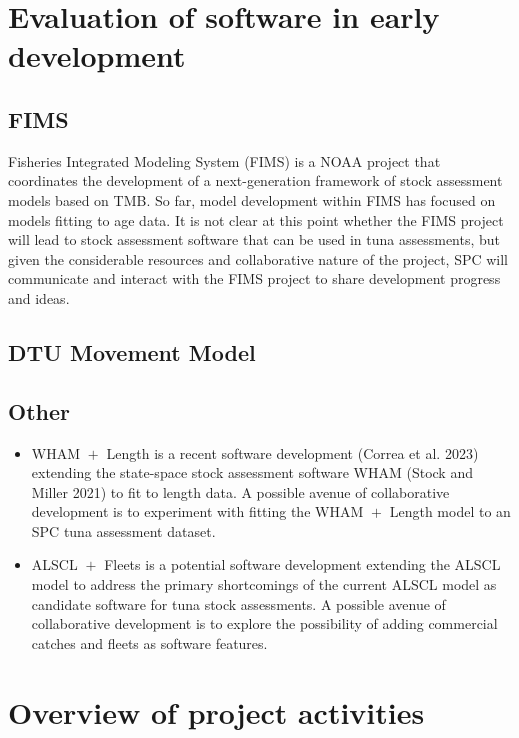 \documentclass{SCreport}
\begin{document}
\section{Evaluation of software in early development}
\label{sec:software-early-development}

\subsection{FIMS}

Fisheries Integrated Modeling System (FIMS) is a NOAA project that coordinates
the development of a next-generation framework of stock assessment models based
on TMB. So far, model development within FIMS has focused on models fitting to
age data. It is not clear at this point whether the FIMS project will lead to
stock assessment software that can be used in tuna assessments, but given the
considerable resources and collaborative nature of the project, SPC will
communicate and interact with the FIMS project to share development progress and
ideas.

\subsection{DTU Movement Model}

\subsection{Other}

\begin{itemize}
  \item WHAM $\!+\!$ Length is a recent software development (Correa et al.
  2023) extending the state-space stock assessment software WHAM (Stock and
  Miller 2021) to fit to length data. A possible avenue of collaborative
  development is to experiment with fitting the WHAM $\!+\!$ Length model to an
  SPC tuna assessment dataset.
  \item ALSCL $\!+\!$ Fleets is a potential software development extending the
  ALSCL model to address the primary shortcomings of the current ALSCL model as
  candidate software for tuna stock assessments. A possible avenue of
  collaborative development is to explore the possibility of adding commercial
  catches and fleets as software features.
\end{itemize}

\section{Overview of project activities}
\end{document}
